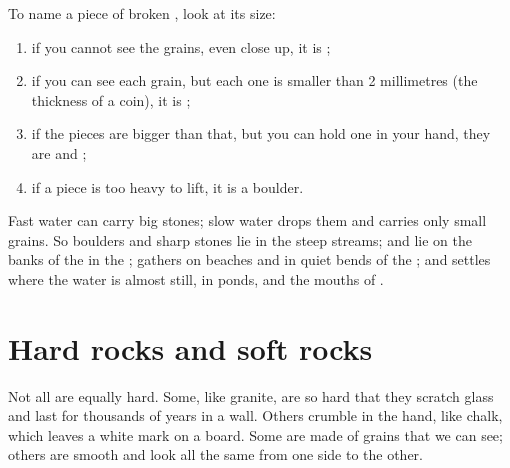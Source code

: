 \begin{method}\label{met:g3:stones-pebbles-sand:sort}
To name a piece of broken , look at its size:
\begin{enumerate}
  \item if you cannot see the grains, even close up, it is ;
  \item if you can see each grain, but each one is smaller than 2
        millimetres (the thickness of a coin), it is ;
  \item if the pieces are bigger than that, but you can hold one in your
        hand, they are  and ;
  \item if a piece is too heavy to lift, it is a boulder.
\end{enumerate}
\end{method}

\begin{example}\label{ex:g3:stones-pebbles-sand:where}
Fast water can carry big stones; slow water drops them and carries only
small grains. So boulders and sharp stones lie in the steep 
streams;  and  lie on the banks of the  in the ;
 gathers on beaches and in quiet bends of the ; and  settles
where the water is almost still, in ponds,  and the mouths of .
\end{example}

\section{Hard rocks and soft rocks}

Not all  are equally hard. Some, like granite, are so hard that they
scratch glass and last for thousands of years in a wall. Others crumble in
the hand, like chalk, which leaves a white mark on a board. Some  are
made of grains that we can see; others are smooth and look all the same
from one side to the other.

